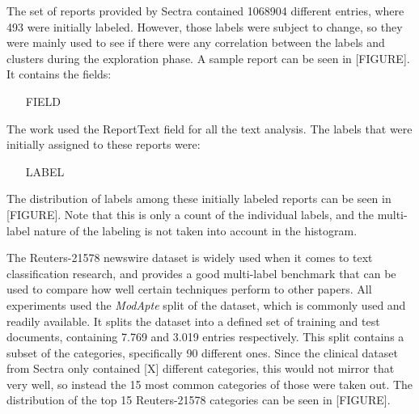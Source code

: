 The set of reports provided by Sectra contained 1068904 different entries, where 493 were initially labeled.
However, those labels were subject to change, so they were mainly used to see if there were any correlation between the labels and clusters during the exploration phase.
A sample report can be seen in [FIGURE].
It contains the fields:
\begin{enumerate}
    \item [FIELD]
\end{enumerate}

The work used the ReportText field for all the text analysis.
The labels that were initially assigned to these reports were:
\begin{enumerate}
    \item [LABEL]
\end{enumerate}

The distribution of labels among these initially labeled reports can be seen in [FIGURE].
Note that this is only a count of the individual labels, and the multi-label nature of the labeling is not taken into account in the histogram.

The Reuters-21578 newswire dataset is widely used when it comes to text classification research, and provides a good multi-label benchmark that can be used to compare how well certain techniques perform to other papers.
All experiments used the \textit{ModApte} split of the dataset, which is commonly used and readily available.
It splits the dataset into a defined set of training and test documents, containing 7.769 and 3.019 entries respectively.
This split contains a subset of the categories, specifically 90 different ones.
Since the clinical dataset from Sectra only contained [X] different categories, this would not mirror that very well, so instead the 15 most common categories of those were taken out.
The distribution of the top 15 Reuters-21578 categories can be seen in [FIGURE].